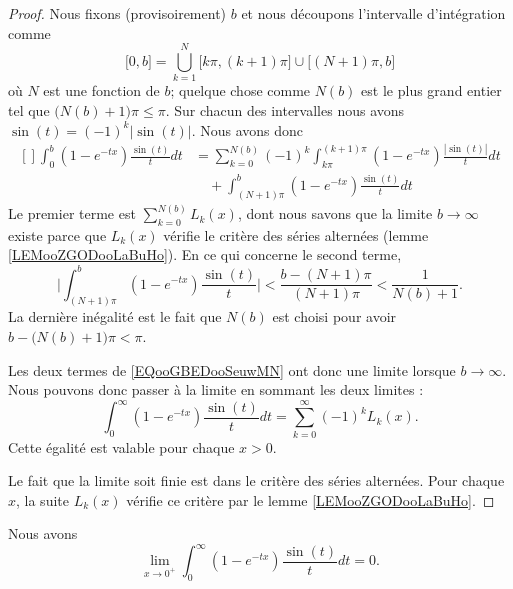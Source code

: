 \begin{proof}
	Nous fixons (provisoirement) \( b\) et nous découpons l'intervalle d'intégration comme
	\begin{equation}
		\mathopen[ 0 , b \mathclose]=\bigcup_{k=1}^N\mathopen[ k\pi , (k+1)\pi \mathclose]\cup\mathopen\big[ (N+1)\pi  , b \mathclose\big]
	\end{equation}
	où \( N\) est une fonction de \( b\); quelque chose comme \( N(b)\) est le plus grand entier tel que \(\big( N(b)+1 \big)\pi\leq \pi\). Sur chacun des intervalles nous avons \( \sin(t)=(-1)^k| \sin(t) |\). Nous avons donc
	\begin{equation}       \label{EQooGBEDooSeuwMN}
		\begin{aligned}[]
			\int_0^b(1- e^{-tx})\frac{ \sin(t) }{ t }dt & =\sum_{k=0}^{N(b)}(-1)^k\int_{k\pi}^{(k+1)\pi}(1- e^{-tx})\frac{ | \sin(t) | }{ t }dt \\
			                                            & \quad+\int_{(N+1)\pi}^b(1- e^{-tx})\frac{ \sin(t) }{ t }dt
		\end{aligned}
	\end{equation}
	Le premier terme est \( \sum_{k=0}^{N(b)}L_k(x)\), dont nous savons que la limite \( b\to \infty\) existe parce que \( L_k(x)\) vérifie le critère des séries alternées (lemme \ref{LEMooZGODooLaBuHo}). En ce qui concerne le second terme,
	\begin{equation}
		\big|\int_{(N+1)\pi}^b (1- e^{-tx})\frac{ \sin(t) }{ t }\big| <  \frac{  b-( N+1 )\pi    }{ ( N+1 )\pi }<\frac{1}{ N(b)+1 }.
	\end{equation}
	La dernière inégalité est le fait que \( N(b)\) est choisi pour avoir \( b-\big( N(b)+1 \big)\pi<\pi\).

	Les deux termes de \eqref{EQooGBEDooSeuwMN} ont donc une limite lorsque \( b\to \infty\). Nous pouvons donc passer à la limite en sommant les deux limites :
	\begin{equation}
		\int_0^{\infty}(1- e^{-tx})\frac{ \sin(t) }{ t }dt=\sum_{k=0}^{\infty}(-1)^kL_k(x).
	\end{equation}
	Cette égalité est valable pour chaque \( x>0\).

	Le fait que la limite soit finie est dans le critère des séries alternées. Pour chaque \( x\), la suite \( L_k(x)\) vérifie ce critère par le lemme \ref{LEMooZGODooLaBuHo}.
\end{proof}

\begin{lemma}       \label{LEMooNZVSooDbZCZx}
	Nous avons
	\begin{equation}
		\lim_{x\to 0^+} \int_0^{\infty}(1- e^{-tx})\frac{ \sin(t) }{ t }dt=0.
	\end{equation}
\end{lemma}

